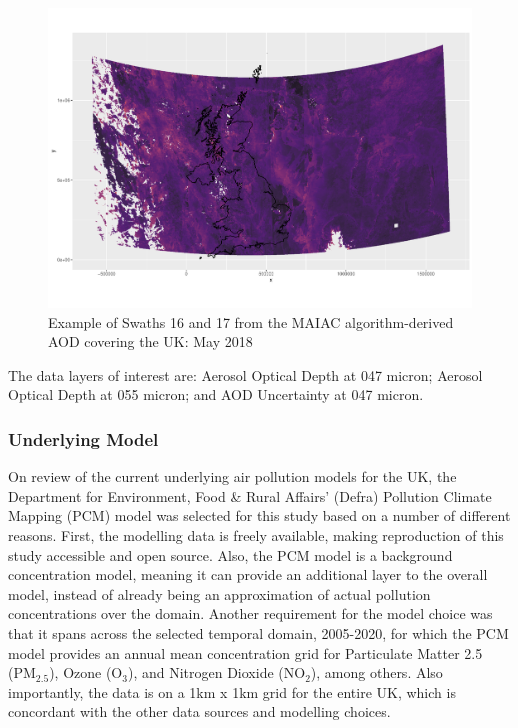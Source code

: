 \begin{figure}[h]
    \centering
    \includegraphics[width=1\textwidth]{Images/Swaths.pdf}
    \caption{Example of Swaths 16 and 17 from the MAIAC algorithm-derived AOD covering the UK: May 2018}
    \label{fig:swaths}
\end{figure}


The data layers of interest are: Aerosol Optical Depth at 047 micron; Aerosol Optical Depth at 055 micron; and AOD Uncertainty at 047 micron.

\subsubsection{Underlying Model}
On review of the current underlying air pollution models for the UK, the Department for Environment, Food \& Rural Affairs' (Defra) Pollution Climate Mapping (PCM) model was selected for this study based on a number of different reasons. First, the modelling data is freely available, making reproduction of this study accessible and open source. Also, the PCM model is a background concentration model, meaning it can provide an additional layer to the overall model, instead of already being an approximation of actual pollution concentrations over the domain. Another requirement for the model choice was that it spans across the selected temporal domain, 2005-2020, for which the PCM model provides an annual mean concentration grid for Particulate Matter 2.5 (PM$_2.5$), Ozone (O$_3$), and Nitrogen Dioxide (NO$_2$), among others. Also importantly, the data is on a 1km x 1km grid for the entire UK, which is concordant with the other data sources and modelling choices. 

